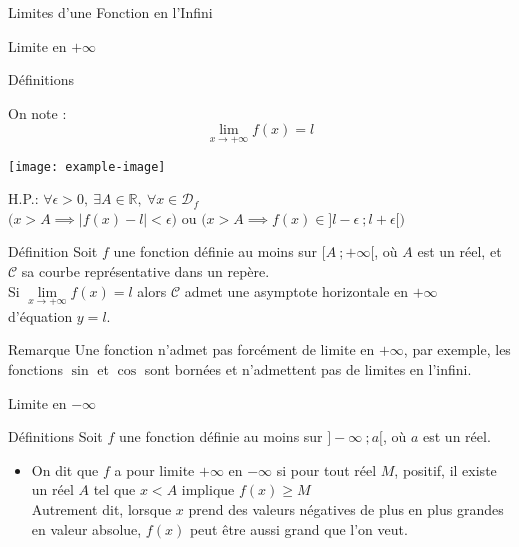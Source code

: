 \documentclass{cours}
\begin{document}
\begin{Gpartie}{Limites d'une Fonction en l'Infini}
\begin{Spartie}{Limite en $+\infty$}
\begin{SSpartie}{Définitions}
\begin{itemize}
                    On note : \[\lim\limits_{x\to +\infty}f(x)=l\]
                    \begin{center}
                            \texttt{[image: example-image]}
                        \parbox{\linewidth}{}
                    \end{center}
                    \vspace*{2ex}
                    H.P.: $\forall\epsilon >0,~\exists A\in\mathbb{R},~\forall x\in\mathcal{D}_f$ \\ \phantom{H.P.: }$\bigg(x>A\implies\left\lvert f(x)-l\right\rvert <\epsilon\bigg)$ ou $\bigg(x>A\implies f(x)\in\big]l-\epsilon~;l+\epsilon\big[\bigg)$
                \end{itemize}
            \end{SSpartie}
            \begin{SSpartie}{Définition} 
                Soit $f$ une fonction définie au moins sur $\big[A~;+\infty\big[$, où $A$ est un réel, et $\mathcal{C}$ sa courbe représentative dans un repère. \\ Si $\lim\limits_{x\to+\infty}f(x)=l$ alors $\mathcal{C}$ admet une asymptote horizontale en $+\infty$ \\ d'équation $y=l$.
            \end{SSpartie}
            \begin{SSpartie}{Remarque} 
                Une fonction n'admet pas forcément de limite en $+\infty$, par exemple, les fonctions $\sin$ et $\cos$ sont bornées et n'admettent pas de limites en l'infini.
            \end{SSpartie}
        \end{Spartie}
        \begin{Spartie}{Limite en $-\infty$} 
            \begin{SSpartie}{Définitions}
                Soit $f$ une fonction définie au moins sur $\big]-\infty~;a\big[$, où $a$ est un réel.
                \begin{itemize}
                    \item   On dit que $f$ a pour limite $+\infty$ en $-\infty$ si pour tout réel $M$, positif, il existe un réel $A$ tel que $x<A$ implique $f(x)\geq M$ \\ Autrement dit, lorsque $x$ prend des valeurs négatives de plus en plus grandes en valeur absolue, $f(x)$ peut être aussi grand que l'on veut.
                    

\end{itemize}
\end{SSpartie}
\end{Spartie}
\end{Gpartie}
\end{document}
